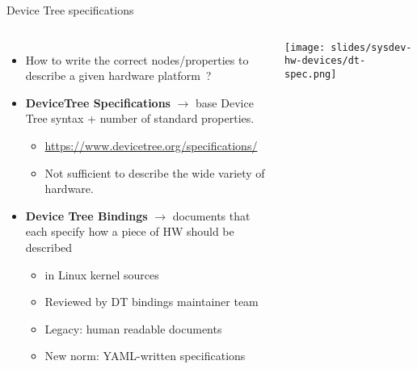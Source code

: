 \begin{frame}{Device Tree specifications}
  \begin{columns}[T]
    \begin{itemize}
    \item How to write the correct nodes/properties to describe a
      given hardware platform~?
    \item {\bf DeviceTree Specifications} $\rightarrow$ base Device
      Tree syntax + number of standard properties.
      \begin{itemize}
      \item \url{https://www.devicetree.org/specifications/}
      \item Not sufficient to describe the wide variety of hardware.
      \end{itemize}
    \item {\bf Device Tree Bindings} $\rightarrow$ documents that each
      specify how a piece of HW should be described
      \begin{itemize}
      \item {} in Linux kernel sources
      \item Reviewed by DT bindings maintainer team
      \item Legacy: human readable documents
      \item New norm: YAML-written specifications
      \end{itemize}
    \end{itemize}
    \texttt{[image: slides/sysdev-hw-devices/dt-spec.png]}
  \end{columns}
\end{frame}


